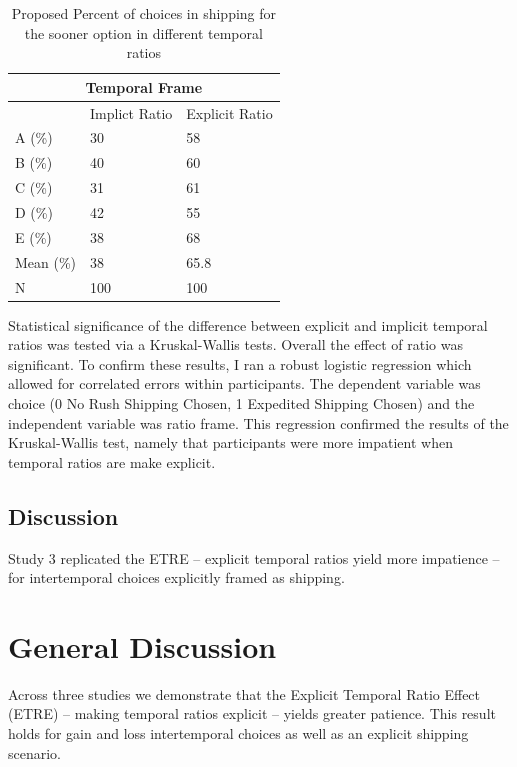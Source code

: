 \documentclass[]{article}
\begin{document}
\begin{table}[!ht]
	\caption{Proposed Percent of choices in shipping for the sooner option in different temporal ratios} 
	\label{tab:study3results}
	\begin{tabular}{ p{3cm}||p{3cm}|p{3cm}  }
		\multicolumn{3}{|c|}{Temporal Frame} \\
		\hline
		& Implict Ratio & Explicit Ratio\\
		\hline
		A (\%)	 & 30  & 58\\
		B (\%) 	 & 40  & 60\\
		C (\%) 	 & 31  & 61\\
		D (\%)   & 42  & 55\\
		E (\%)   & 38  & 68\\
		Mean (\%) & 38  & 65.8 \\
		N  	 & 100  & 100\\
		\hline	
	\end{tabular}
\end{table}

Statistical significance of  the difference between explicit and implicit temporal ratios was tested via a Kruskal-Wallis tests.
Overall the effect of ratio was significant. 
To confirm these results, I ran a robust logistic regression which allowed for correlated errors within participants.
The dependent variable was choice (0 No Rush Shipping Chosen, 1 Expedited Shipping Chosen) and the independent variable was ratio frame. 
This regression confirmed the results of the Kruskal-Wallis test, namely that participants were more impatient when temporal ratios are make explicit. 

\subsection{Discussion}

Study 3 replicated the ETRE -- explicit temporal ratios yield more impatience -- for intertemporal choices explicitly framed as shipping. 


\section{General Discussion}

Across three studies we demonstrate that the Explicit Temporal Ratio Effect (ETRE) -- making temporal ratios explicit -- yields greater patience. 
This result holds for gain and loss intertemporal choices as well as an explicit shipping scenario. 
\end{document}
